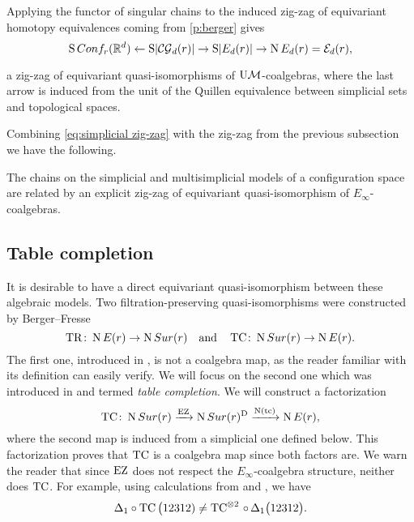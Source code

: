 Applying the functor of singular chains to the induced zig-zag of equivariant homotopy equivalences coming from \cref{p:berger} gives
\begin{equation}\label{eq:simplicial zig-zag}
	\operatorname{S}Conf_{r}(\mathbb{R}^{d}) \leftarrow
	\operatorname{S}\lvert\mathcal{CG}_d(r)\rvert \to
	\operatorname{S}\lvert E_d(r)\rvert \to
	\operatorname{N} E_d(r)= \mathcal{E}_d(r),
\end{equation}

a zig-zag of equivariant quasi-isomorphisms of $\mathrm{U}\mathcal{M}$-coalgebras, where the last arrow is induced from the unit of the Quillen equivalence between simplicial sets and topological spaces.

Combining \eqref{eq:simplicial zig-zag} with the zig-zag from the previous subsection we have the following.
\begin{theorem}
	The chains on the simplicial and multisimplicial models of a configuration space are related by an explicit zig-zag of equivariant quasi-isomorphism of $E_\infty$-coalgebras.
\end{theorem}

\subsection{Table completion}\label{ss:table completion}

It is desirable to have a direct equivariant quasi-isomorphism between these algebraic models.
Two filtration-preserving quasi-isomorphisms were constructed by Berger--Fresse
\[
\operatorname{TR} \colon \operatorname{N}E(r) \to \operatorname{N}Sur(r)
\quad \text{and} \quad
\operatorname{TC} \colon \operatorname{N}Sur(r) \to \operatorname{N} E(r).
\]
The first one, introduced in \cite[1$\cdot$3]{berger2004combinatorial}, is not a coalgebra map, as the reader familiar with its definition can easily verify.
We will focus on the second one which was introduced in \cite{berger2002prismatic} and termed \textit{table completion}.
We will construct a factorization
\[
\operatorname{TC} \colon \operatorname{N}Sur(r) \xrightarrow{\operatorname{EZ}} \operatorname{N}Sur(r)^{\mathrm{D}} \xrightarrow{\operatorname{N}(\operatorname{tc})} \operatorname{N} E(r),
\]
where the second map is induced from a simplicial one defined below.
This factorization proves that $\operatorname{TC}$ is a coalgebra map since both factors are.
We warn the reader that since $\operatorname{EZ}$ does not respect the $E_\infty$-coalgebra structure,
neither does $\operatorname{TC}$.
For example, using calculations from \cite{medina2022cube_einfty} and \cite{berger2002prismatic}, we have
\[
\Delta_1 \circ \operatorname{TC}\big(12312) \neq
\operatorname{TC} ^{\otimes 2}\, \circ \, \Delta_1\big(12312\big).
\]

